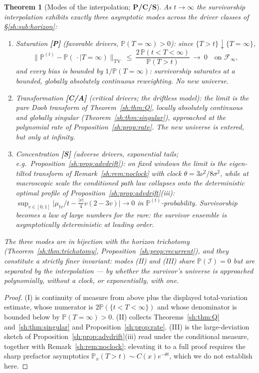\documentclass[11pt]{article}
\numberwithin{equation}{section}
\theoremstyle{plain}
\newtheorem{theorem}{Theorem}[section]
\theoremstyle{definition}
\theoremstyle{remark}
\newcommand{\PP}{\mathbb{P}}
\newcommand{\Imm}{\mathcal{I}}
\newcommand{\Fc}{\mathcal{F}}
\begin{document}
\begin{theorem}[Modes of the interpolation; \textbf{P/C/S}]
\label{sh:thm:modes}
As $t\to\infty$ the survivorship interpolation exhibits exactly three
asymptotic modes across the driver classes of \S\ref{sh:sub:horizon}:
\begin{enumerate}[label=\emph{(\Roman*)},itemsep=2pt]
\item \emph{Saturation} \textbf{[P]} (favorable drivers,
$\PP(T=\infty)>0$): since $\{T>t\}\downarrow\{T=\infty\}$,
\[
\bigl\|\PP^{(t)}-\PP(\,\cdot\mid T=\infty)\bigr\|_{\mathrm{TV}}
\ \le\ \frac{2\,\PP(t<T<\infty)}{\PP(T>t)}\ \longrightarrow\ 0
\quad\text{on }\Fc_\infty,
\]
and every bias is bounded by $1/\PP(T=\infty)$: survivorship saturates at
a bounded, globally absolutely continuous reweighting. No new universe.
\item \emph{Transformation} \textbf{[C/A]} (critical drivers; the
driftless model): the limit is the pure Doob transform of
Theorem~\ref{sh:thm:Q}, locally absolutely continuous and globally
singular (Theorem~\ref{sh:thm:singular}), approached at the polynomial
rate of Proposition~\ref{sh:prop:rate}. The new universe is entered, but
only at infinity.
\item \emph{Concentration} \textbf{[S]} (adverse drivers, exponential
tails; e.g.\ Proposition~\ref{sh:prop:advdrift}): on fixed windows the
limit is the eigen-tilted transform of
Remark~\ref{sh:rem:noclock} with clock
$\theta=3\nu^2/8\sigma^2$, while at macroscopic scale the conditioned
path law collapses onto the deterministic optimal profile of
Proposition~\ref{sh:prop:advdrift}(iii):
$\sup_{v\in[0,1]}\bigl|\mu_{tv}/t-\tfrac{|\nu|}4v(2-3v)\bigr|\to0$ in
$\PP^{(t)}$-probability. Survivorship becomes a law of large numbers for
the rare: the survivor ensemble is asymptotically deterministic at
leading order.
\end{enumerate}
The three modes are in bijection with the horizon trichotomy
(Theorem~\ref{sh:thm:trichotomy}, Proposition~\ref{sh:prop:recurrent}),
and they constitute a strictly finer invariant: modes (II) and (III)
share $\PP(\Imm)=0$ but are separated by the interpolation --- by whether
the survivor's universe is approached polynomially, without a clock, or
exponentially, with one.
\end{theorem}

\begin{proof}
(I) is continuity of measure from above plus the displayed
total-variation estimate, whose numerator is
$2\PP(\{t<T<\infty\})$ and whose denominator is bounded below by
$\PP(T=\infty)>0$. (II) collects Theorems~\ref{sh:thm:Q}
and~\ref{sh:thm:singular} and Proposition~\ref{sh:prop:rate}. (III) is
the large-deviation sketch of Proposition~\ref{sh:prop:advdrift}(iii)
read under the conditional measure, together with
Remark~\ref{sh:rem:noclock}; elevating it to a full proof requires the
sharp prefactor asymptotics $\PP_x(T>t)\sim C(x)e^{-\theta t}$, which we
do not establish here.
\end{proof}
\end{document}
